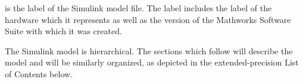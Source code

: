 \documentclass[crop=false,float=true,class=scrreprt]{standalone}
\begin{document}
 is the label of the Simulink model file.
The label includes the label of the hardware which it represents 
as well as the version of the Mathworks Software Suite with which it was created.
{}


The Simulink model is hierarchical.
The sections which follow will describe the model and will be similarly organized,
as depicted in the extended-precision List of Contents below.
\end{document}
